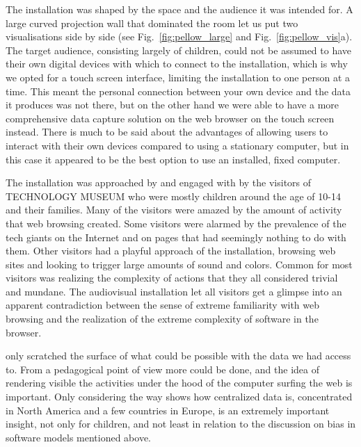 \documentclass[manuscript,screen]{acmart}
\begin{document}

The installation was shaped by the space and the audience it was intended for. A large curved projection wall that dominated the room let us put two visualisations side by side (see Fig.~\ref{fig:pellow_large} and Fig.~\ref{fig:pellow_vis}a). The target audience, consisting largely of children, could not be assumed to have their own digital devices with which to connect to the installation, which is why we opted for a touch screen interface, limiting the installation to one person at a time. This meant the personal connection between your own device and the data it produces was not there, but on the other hand we were able to have a more comprehensive data capture solution on the web browser on the touch screen instead. There is much to be said about the advantages of allowing users to interact with their own devices compared to using a stationary computer, but in this case it appeared to be the best option to use an installed, fixed computer.

The installation was approached by and engaged with by the visitors of TECHNOLOGY MUSEUM
who were mostly children around the age of 10-14 and their families. Many of the visitors were amazed by the amount of activity that web browsing created. Some visitors were alarmed by the prevalence of the tech giants on the Internet and on pages that had seemingly nothing to do with them. Other visitors had a playful approach of the installation, browsing web sites and looking to trigger large amounts of sound and colors. Common for most visitors was realizing the complexity of actions that they all considered trivial and mundane. The audiovisual installation let all visitors get a glimpse into an apparent contradiction between the sense of extreme familiarity with web browsing and the realization of the extreme  complexity of software in the browser. 

\Pellow only scratched the surface of what could be possible with the data we had access to. From a pedagogical point of view more could be done, and the idea of rendering visible the activities under the hood of the computer surfing the web is important. Only considering the way \Pellow shows how centralized data is, concentrated in North America and a few countries in Europe, is an extremely important insight, not only for children, and not least in relation to the discussion on bias in software models mentioned above.
\end{document}
